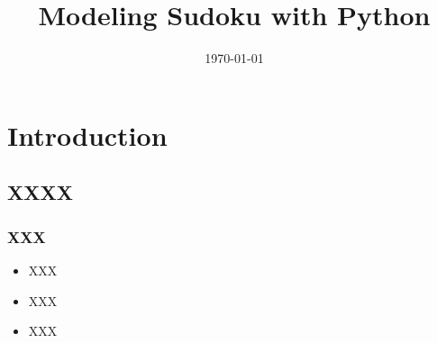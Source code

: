 \documentclass[draft,12pt,letterpaper]{beamer}
\title{Modeling Sudoku with Python}
\author{\Us}
\date{\today}
\begin{document}
\frame{\titlepage}

\section[Outline]{}
\frame{\tableofcontents}

\section{Introduction}
\subsection{XXXX}
\frame
{
  \frametitle{XXX}

  \begin{itemize}
  \item<1-> XXX
  \item<2-> XXX
  \item<3-> XXX      
  \end{itemize}
}

\frame
{
  \sudokuexampleone
}
\end{document}
